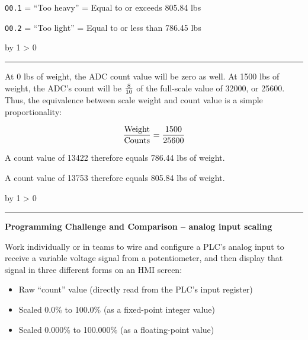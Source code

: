 \documentclass[12pt,a4paper]{article}
\def\oppgave{
            \advance\questnum by 1
            \ifnum \questnum > 0
                 \hrule
                 \vskip 3pt
                 \leftline{Oppgave \the\questnum}
                 \vskip 3pt \fi}
\def\notes{
           \advance\explnum by 1
           \ifnum \explnum > 0
                \hrule
                \vskip 3pt
                \leftline{Notes \the\explnum}
                \vskip 3pt \fi}
\begin{document}
\vskip 10pt

{\tt O0.1} = ``Too heavy'' = Equal to or exceeds 805.84 lbs

\vskip 10pt

{\tt O0.2} = ``Too light'' = Equal to or less than 786.45 lbs

\vskip 10pt \filbreak 





\notes{} 

At 0 lbs of weight, the ADC count value will be zero as well.  At 1500 lbs of weight, the ADC's count will be $8 \over 10$ of the full-scale value of 32000, or 25600.  Thus, the equivalence between scale weight and count value is a simple proportionality:

$${\hbox{Weight} \over \hbox{Counts}} = {1500 \over 25600}$$

\vskip 10pt

A count value of 13422 therefore equals 786.44 lbs of weight.

\vskip 10pt

A count value of 13753 therefore equals 805.84 lbs of weight.


\vfil \eject 



\oppgave{} 

\noindent
{\bf Programming Challenge and Comparison -- analog input scaling} 

\vskip 10pt

Work individually or in teams to wire and configure a PLC's analog input to receive a variable voltage signal from a potentiometer, and then display that signal in three different forms on an HMI screen:

\begin{itemize}
\item{} Raw ``count'' value (directly read from the PLC's input register)
\item{} Scaled 0.0\% to 100.0\% (as a fixed-point integer value)
\item{} Scaled 0.000\% to 100.000\% (as a floating-point value)
\end{itemize}
\end{document}
